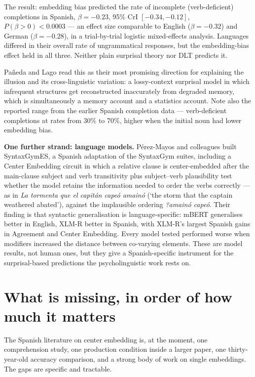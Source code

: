 \documentclass[11pt, a4paper]{article}
\begin{document}
\vspace{0.4em}
The result: embedding bias predicted the rate of incomplete (verb-deficient) completions in Spanish, $\beta=-0.23$, 95\% CrI $[-0.34,-0.12]$, $P(\beta>0)<0.0003$ --- an effect size comparable to English ($\beta=-0.32$) and German ($\beta=-0.28$), in a trial-by-trial logistic mixed-effects analysis. Languages differed in their overall rate of ungrammatical responses, but the embedding-bias effect held in all three. Neither plain surprisal theory nor DLT predicts it.

Pañeda and Lago read this as their most promising direction for explaining the illusion and its cross-linguistic variation: a lossy-context surprisal model in which infrequent structures get reconstructed inaccurately from degraded memory, which is simultaneously a memory account and a statistics account. Note also the reported range from the earlier Spanish completion data --- verb-deficient completions at rates from 30\% to 70\%, higher when the initial noun had lower embedding bias.

\textbf{One further strand: language models.} Pérez-Mayos and colleagues built SyntaxGymES, a Spanish adaptation of the SyntaxGym suites, including a Center Embedding circuit in which a relative clause is center-embedded after the main-clause subject and verb transitivity plus subject--verb plausibility test whether the model retains the information needed to order the verbs correctly --- as in \emph{La tormenta que el capitán capeó amainó} (`the storm that the captain weathered abated'), against the implausible ordering \emph{?amainó capeó}. Their finding is that syntactic generalisation is language-specific: mBERT generalises better in English, XLM-R better in Spanish, with XLM-R's largest Spanish gains in Agreement and Center Embedding. Every model tested performed worse when modifiers increased the distance between co-varying elements. These are model results, not human ones, but they give a Spanish-specific instrument for the surprisal-based predictions the psycholinguistic work rests on.

\section{What is missing, in order of how much it matters}

The Spanish literature on center embedding is, at the moment, one comprehension study, one production condition inside a larger paper, one thirty-year-old accuracy comparison, and a strong body of work on single embeddings. The gaps are specific and tractable.
\end{document}
